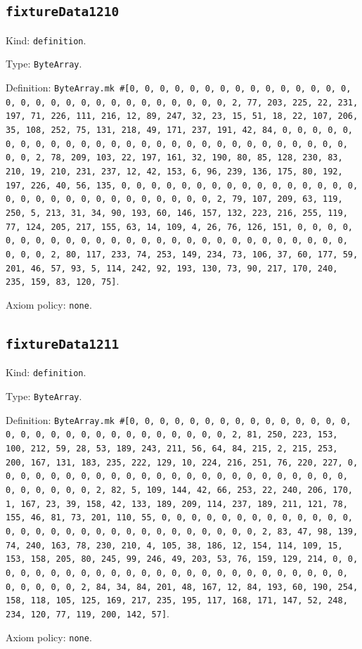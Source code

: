 \documentclass[11pt]{article}
\begin{document}
\subsection*{\texttt{fixtureData1210}}
\noindent Kind: \texttt{definition}.\par
\noindent Type: \texttt{ByteArray}.\par
\noindent Definition: \texttt{ByteArray.mk \#[0, 0, 0, 0, 0, 0, 0, 0, 0, 0, 0, 0, 0, 0, 0, 0, 0, 0, 0, 0, 0, 0, 0, 0, 0, 0, 0, 0, 0, 0, 2, 77, 203, 225, 22, 231, 197, 71, 226, 111, 216, 12, 89, 247, 32, 23, 15, 51, 18, 22, 107, 206, 35, 108, 252, 75, 131, 218, 49, 171, 237, 191, 42, 84, 0, 0, 0, 0, 0, 0, 0, 0, 0, 0, 0, 0, 0, 0, 0, 0, 0, 0, 0, 0, 0, 0, 0, 0, 0, 0, 0, 0, 0, 0, 2, 78, 209, 103, 22, 197, 161, 32, 190, 80, 85, 128, 230, 83, 210, 19, 210, 231, 237, 12, 42, 153, 6, 96, 239, 136, 175, 80, 192, 197, 226, 40, 56, 135, 0, 0, 0, 0, 0, 0, 0, 0, 0, 0, 0, 0, 0, 0, 0, 0, 0, 0, 0, 0, 0, 0, 0, 0, 0, 0, 0, 0, 0, 0, 2, 79, 107, 209, 63, 119, 250, 5, 213, 31, 34, 90, 193, 60, 146, 157, 132, 223, 216, 255, 119, 77, 124, 205, 217, 155, 63, 14, 109, 4, 26, 76, 126, 151, 0, 0, 0, 0, 0, 0, 0, 0, 0, 0, 0, 0, 0, 0, 0, 0, 0, 0, 0, 0, 0, 0, 0, 0, 0, 0, 0, 0, 0, 0, 2, 80, 117, 233, 74, 253, 149, 234, 73, 106, 37, 60, 177, 59, 201, 46, 57, 93, 5, 114, 242, 92, 193, 130, 73, 90, 217, 170, 240, 235, 159, 83, 120, 75]}.\par
\noindent Axiom policy: \texttt{none}.\par
\subsection*{\texttt{fixtureData1211}}
\noindent Kind: \texttt{definition}.\par
\noindent Type: \texttt{ByteArray}.\par
\noindent Definition: \texttt{ByteArray.mk \#[0, 0, 0, 0, 0, 0, 0, 0, 0, 0, 0, 0, 0, 0, 0, 0, 0, 0, 0, 0, 0, 0, 0, 0, 0, 0, 0, 0, 0, 0, 2, 81, 250, 223, 153, 100, 212, 59, 28, 53, 189, 243, 211, 56, 64, 84, 215, 2, 215, 253, 200, 167, 131, 183, 235, 222, 129, 10, 224, 216, 251, 76, 220, 227, 0, 0, 0, 0, 0, 0, 0, 0, 0, 0, 0, 0, 0, 0, 0, 0, 0, 0, 0, 0, 0, 0, 0, 0, 0, 0, 0, 0, 0, 0, 2, 82, 5, 109, 144, 42, 66, 253, 22, 240, 206, 170, 1, 167, 23, 39, 158, 42, 133, 189, 209, 114, 237, 189, 211, 121, 78, 155, 46, 81, 73, 201, 110, 55, 0, 0, 0, 0, 0, 0, 0, 0, 0, 0, 0, 0, 0, 0, 0, 0, 0, 0, 0, 0, 0, 0, 0, 0, 0, 0, 0, 0, 0, 0, 2, 83, 47, 98, 139, 74, 240, 163, 78, 230, 210, 4, 105, 38, 186, 12, 154, 114, 109, 15, 153, 158, 205, 80, 245, 99, 246, 49, 203, 53, 76, 159, 129, 214, 0, 0, 0, 0, 0, 0, 0, 0, 0, 0, 0, 0, 0, 0, 0, 0, 0, 0, 0, 0, 0, 0, 0, 0, 0, 0, 0, 0, 0, 0, 2, 84, 34, 84, 201, 48, 167, 12, 84, 193, 60, 190, 254, 158, 118, 105, 125, 169, 217, 235, 195, 117, 168, 171, 147, 52, 248, 234, 120, 77, 119, 200, 142, 57]}.\par
\noindent Axiom policy: \texttt{none}.\par
\end{document}
